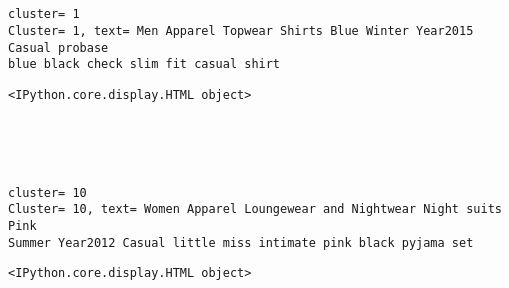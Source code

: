 \documentclass[11pt]{article}
\begin{document}
    
    \begin{center}
    \end{center}
    { \hspace*{\fill} \\}
    
    \begin{center}
    \end{center}
    { \hspace*{\fill} \\}
    
    \begin{Verbatim}[commandchars=\\\{\}]
cluster= 1
Cluster= 1, text= Men Apparel Topwear Shirts Blue Winter Year2015 Casual probase
blue black check slim fit casual shirt
    \end{Verbatim}

    
    \begin{Verbatim}[commandchars=\\\{\}]
<IPython.core.display.HTML object>
    \end{Verbatim}

    
    \begin{center}
    \end{center}
    { \hspace*{\fill} \\}
    
    \begin{center}
    \end{center}
    { \hspace*{\fill} \\}
    
    \begin{Verbatim}[commandchars=\\\{\}]
cluster= 10
Cluster= 10, text= Women Apparel Loungewear and Nightwear Night suits Pink
Summer Year2012 Casual little miss intimate pink black pyjama set
    \end{Verbatim}

    
    \begin{Verbatim}[commandchars=\\\{\}]
<IPython.core.display.HTML object>
    \end{Verbatim}
\end{document}
